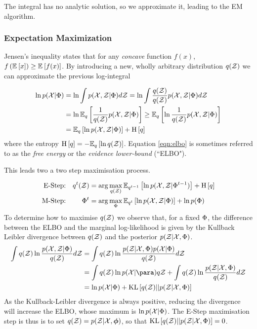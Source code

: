 The integral has no analytic solution, so we approximate it, leading to the EM algorithm.
\subsubsection{Expectation Maximization}
Jensen's inequality states that for any \emph{concave} function $f(x)$, $f\left(\ex{x}{}\right) \geq \ex{f(x)}{}$. By introducing a new, wholly arbitrary distribution $q(\zdat)$ we can approximate the previous log-integral

\begin{align}
 \ln p(\xdat|\params) & = \ln \int \joint d\zdat =  \ln \int \frac{q(\zdat)}{q(\zdat)} \joint d\zdat\\ 
     &=  \ln \ex{\oneover{q(\zdat)}\joint}{q} \geq  \ex{\ln \oneover{q(\zdat)}\joint}{q}\\
     &= \ex{\ln \joint}{q} + \ent{q} \label{eqn:elbo}
\end{align}
where the entropy $\ent{q} = -\ex{\ln q(\zdat)}{q}$. Equation \eqref{eqn:elbo} is sometimes referred to as the \emph{free energy} or the \emph{evidence lower-bound} (``ELBO").

This leads two a two step maximisation process.

\begin{align}
\text{E-Step:} & & q^t(\zdat) & = \arg \max_{q(\zdat)} \ex{\ln p(\xdat, \zdat|\params^{t-1})}{q^{t-1}} + \ent{q} \label{eqn:estep} \\
\text{M-Step:} & & \params^t & = \arg \max_{\params} \ex{\ln \joint}{q^{t}} + \ln p(\params) \label{eqn:mstep}
\end{align}
To determine how to maximise $q(\zdat)$ we observe that, for a fixed $\params$, the difference between the ELBO and the marginal log-likelihood is given by
 the Kullback Leibler divergence between $q(\zdat)$ and the posterior $p(\zdat|\xdat, \params)$.
\begin{align}
\int q(\zdat) \ln \frac{p(\xdat, \zdat|\params)}{q(\zdat)} d\zdat
& = \int q(\zdat) \ln \frac{p(\zdat|\xdat, \params)p(\xdat | \params)}{q(\zdat)} d\zdat \\
& = \int q(\zdat) \ln p(\xdat | \para) q\zdat + \int q(\zdat)\ln\frac{p(\zdat|\xdat, \params)}{q(\zdat)} d\zdat \\
& = \ln p(\xdat | \params) + \kl{q(\zdat)}{p(\zdat|\xdat, \params)}
\end{align}
As the Kullback-Leibler divergence is always positive, reducing the divergence will increase the ELBO, whose maximum is $\ln p(\xdat | \params)$. The E-Step maximisation step is thus is to set $q(\zdat) = p(\zdat | \xdat, \param)$, so that $\kl{q(\zdat)}{p(\zdat|\xdat, \params)} = 0$.

